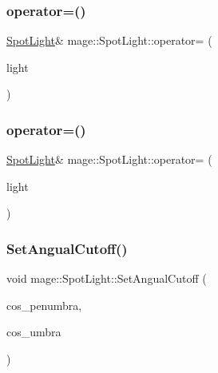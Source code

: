 \hypertarget{classmage_1_1_spot_light_a65b316706e023797cfa219add1cf4d40}{}\label{classmage_1_1_spot_light_a65b316706e023797cfa219add1cf4d40} 
\subsubsection{\texorpdfstring{operator=()}{operator=()}\hspace{0.1cm}{\footnotesize\ttfamily [1/2]}}
{\footnotesize\ttfamily \hyperlink{classmage_1_1_spot_light}{Spot\+Light}\& mage\+::\+Spot\+Light\+::operator= (\begin{DoxyParamCaption}\item[{const \hyperlink{classmage_1_1_spot_light}{Spot\+Light} \&}]{light }\end{DoxyParamCaption})\hspace{0.3cm}{\ttfamily [default]}}

\hypertarget{classmage_1_1_spot_light_a540360b14d52494a792066254d1cd6db}{}\label{classmage_1_1_spot_light_a540360b14d52494a792066254d1cd6db} 
\subsubsection{\texorpdfstring{operator=()}{operator=()}\hspace{0.1cm}{\footnotesize\ttfamily [2/2]}}
{\footnotesize\ttfamily \hyperlink{classmage_1_1_spot_light}{Spot\+Light}\& mage\+::\+Spot\+Light\+::operator= (\begin{DoxyParamCaption}\item[{\hyperlink{classmage_1_1_spot_light}{Spot\+Light} \&\&}]{light }\end{DoxyParamCaption})\hspace{0.3cm}{\ttfamily [default]}}

\hypertarget{classmage_1_1_spot_light_a251358633eff92a9a77f5cc251dc1881}{}\label{classmage_1_1_spot_light_a251358633eff92a9a77f5cc251dc1881} 
\subsubsection{\texorpdfstring{Set\+Angual\+Cutoff()}{SetAngualCutoff()}}
{\footnotesize\ttfamily void mage\+::\+Spot\+Light\+::\+Set\+Angual\+Cutoff (\begin{DoxyParamCaption}\item[{float}]{cos\+\_\+penumbra,  }\item[{float}]{cos\+\_\+umbra }\end{DoxyParamCaption})}

